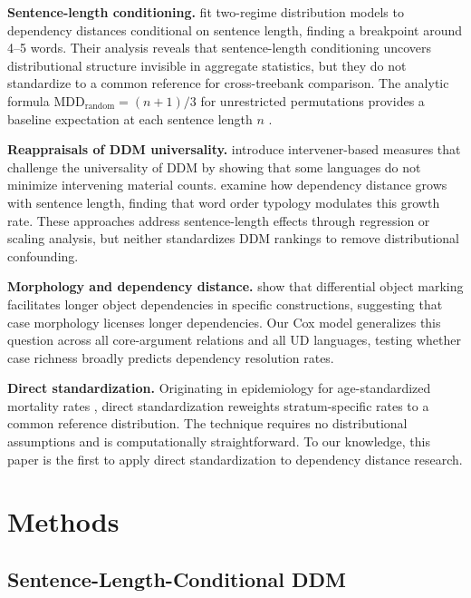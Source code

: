 \documentclass[11pt,letterpaper]{article}
\begin{document}
\textbf{Sentence-length conditioning.} \citet{Petrini2022} fit two-regime distribution models to dependency distances conditional on sentence length, finding a breakpoint around 4--5 words. Their analysis reveals that sentence-length conditioning uncovers distributional structure invisible in aggregate statistics, but they do not standardize to a common reference for cross-treebank comparison. The analytic formula $\text{MDD}_{\text{random}} = (n+1)/3$ for unrestricted permutations provides a baseline expectation at each sentence length $n$ \citep{Futrell2015}.

\textbf{Reappraisals of DDM universality.} \citet{Yadav2022} introduce intervener-based measures that challenge the universality of DDM by showing that some languages do not minimize intervening material counts. \citet{Park2022} examine how dependency distance grows with sentence length, finding that word order typology modulates this growth rate. These approaches address sentence-length effects through regression or scaling analysis, but neither standardizes DDM rankings to remove distributional confounding.

\textbf{Morphology and dependency distance.} \citet{Holmes2024} show that differential object marking facilitates longer object dependencies in specific constructions, suggesting that case morphology licenses longer dependencies. Our Cox model generalizes this question across all core-argument relations and all UD languages, testing whether case richness broadly predicts dependency resolution rates.

\textbf{Direct standardization.} Originating in epidemiology for age-standardized mortality rates \citep{Rothman2008}, direct standardization reweights stratum-specific rates to a common reference distribution. The technique requires no distributional assumptions and is computationally straightforward. To our knowledge, this paper is the first to apply direct standardization to dependency distance research.

\section{Methods}

\subsection{Sentence-Length-Conditional DDM}
\end{document}
